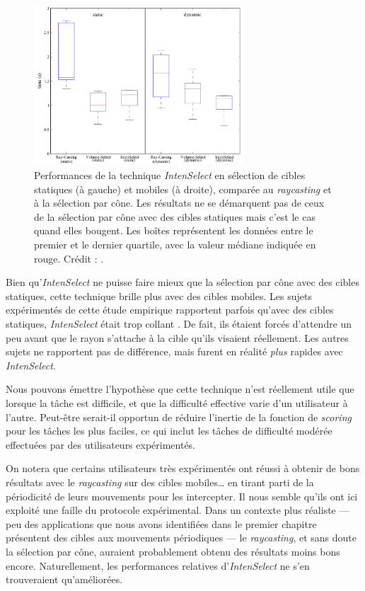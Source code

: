 	\begin{figure}[!htb]
		\centering
		\includegraphics[width=0.70\textwidth]{figures/ch2/intensPerf}
		\caption[\emph{IntenSelect} -- performances]{Performances de la technique \emph{IntenSelect} en sélection de cibles statiques (à gauche) et mobiles (à droite), comparée au \emph{raycasting} et à la sélection par cône. Les résultats ne se démarquent pas de ceux de la sélection par cône avec des cibles statiques mais c'est le cas quand elles bougent. Les boîtes représentent les données entre le premier et le dernier quartile, avec la valeur médiane indiquée en rouge. Crédit : \cite{de2005intenselect}.}
		\label{fig:intensPerf}
	\end{figure}
	
	Bien qu'\emph{IntenSelect} ne puisse faire mieux que la sélection par cône avec des cibles statiques, cette technique brille plus avec des cibles mobiles. Les sujets expérimentés de cette étude empirique rapportent parfois qu'avec des cibles statiques, \emph{IntenSelect} était trop \og collant \fg{}. De fait, ils étaient forcés d'attendre un peu avant que le rayon s'attache à la cible qu'ils visaient réellement. Les autres sujets ne rapportent pas de différence, mais furent en réalité \emph{plus} rapides avec \emph{IntenSelect}.
	
	Nous pouvons émettre l'hypothèse que cette technique n'est réellement utile que lorsque la tâche est difficile, et que la difficulté effective varie d'un utilisateur à l'autre. Peut-être serait-il opportun de réduire l'inertie de la fonction de \emph{scoring} pour les tâches les plus faciles, ce qui inclut les tâches de difficulté modérée effectuées par des utilisateurs expérimentés.
	
	On notera que certains utilisateurs très expérimentés ont réussi à obtenir de bons résultats avec le \emph{raycasting} sur des cibles mobiles\ldots{} en tirant parti de la périodicité de leurs mouvements pour les intercepter. Il nous semble qu'ils ont ici exploité une faille du protocole expérimental. Dans un contexte plus réaliste --- peu des applications que nous avons identifiées dans le premier chapitre présentent des cibles aux mouvements périodiques --- le \emph{raycasting}, et sans doute la sélection par cône, auraient probablement obtenu des résultats moins bons encore. Naturellement, les performances relatives d'\emph{IntenSelect} ne s'en trouveraient qu'améliorées.
	
